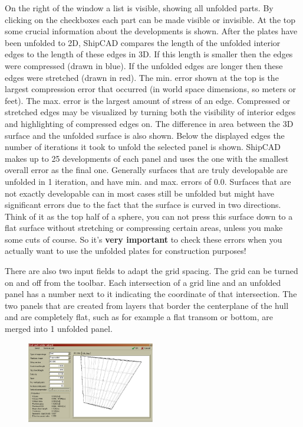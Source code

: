 \documentclass[12pt]{article}
\begin{document}
On the right of the window a list is visible, showing all unfolded
parts. By clicking on the checkboxes each part can be made visible or
invisible. At the top some crucial information about the developments
is shown. After the plates have been unfolded to 2D, ShipCAD compares
the length of the unfolded interior edges to the length of these edges
in 3D. If this length is smaller then the edges were compressed (drawn
in blue). If the unfolded edges are longer then these edges were
stretched (drawn in red). The min. error shown at the top is the
largest compression error that occurred (in world space dimensions, so
meters or feet). The max. error is the largest amount of stress of an
edge. Compressed or stretched edges may be visualized by turning both
the visibility of interior edges and highlighting of compressed edges
on. The difference in area between the 3D surface and the unfolded
surface is also shown. Below the displayed edges the number of
iterations it took to unfold the selected panel is shown. ShipCAD
makes up to 25 developments of each panel and uses the one with the
smallest overall error as the final one. Generally surfaces that are
truly developable are unfolded in 1 iteration, and have min. and
max. errors of 0.0. Surfaces that are not exactly developable can in
most cases still be unfolded but might have significant errors due to
the fact that the surface is curved in two directions. Think of it as
the top half of a sphere, you can not press this surface down to a
flat surface without stretching or compressing certain areas, unless
you make some cuts of course.  So it's \textbf{very important} to check these
errors when you actually want to use the unfolded plates for
construction purposes!

There are also two input fields to adapt the grid spacing. The grid
can be turned on and off from the toolbar. Each intersection of a grid
line and an unfolded panel has a number next to it indicating the
coordinate of that intersection.  The two panels that are created from
layers that border the centerplane of the hull and are completely
flat, such as for example a flat transom or bottom, are merged into 1
unfolded panel.

\begin{figure}
        \centering
        \includegraphics[width=0.5\textwidth,natwidth=566,natheight=360]{keelandrudder.png}
        \caption{}
        \label{fig:keelandrudder}
\end{figure}
\end{document}
